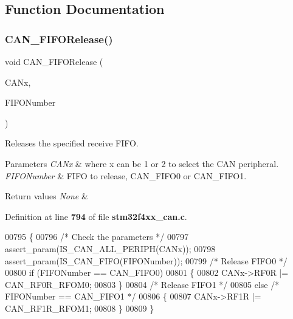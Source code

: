 \subsection{Function Documentation}
\mbox{\label{group__CAN__Group3_ga1bc3b39471e579b4101624c33d27918b}} 
\subsubsection{C\+A\+N\+\_\+\+F\+I\+F\+O\+Release()}
{\footnotesize\ttfamily void C\+A\+N\+\_\+\+F\+I\+F\+O\+Release (\begin{DoxyParamCaption}\item[{\textbf{ C\+A\+N\+\_\+\+Type\+Def} $\ast$}]{C\+A\+Nx,  }\item[{uint8\+\_\+t}]{F\+I\+F\+O\+Number }\end{DoxyParamCaption})}



Releases the specified receive F\+I\+FO. 


\begin{DoxyParams}{Parameters}
{\em C\+A\+Nx} & where x can be 1 or 2 to select the C\+AN peripheral. \\
\hline
{\em F\+I\+F\+O\+Number} & F\+I\+FO to release, C\+A\+N\+\_\+\+F\+I\+F\+O0 or C\+A\+N\+\_\+\+F\+I\+F\+O1. \\
\hline
\end{DoxyParams}

\begin{DoxyRetVals}{Return values}
{\em None} & \\
\hline
\end{DoxyRetVals}


Definition at line \textbf{ 794} of file \textbf{ stm32f4xx\+\_\+can.\+c}.


\begin{DoxyCode}
00795 \{
00796   \textcolor{comment}{/* Check the parameters */}
00797   assert_param(IS_CAN_ALL_PERIPH(CANx));
00798   assert_param(IS_CAN_FIFO(FIFONumber));
00799   \textcolor{comment}{/* Release FIFO0 */}
00800   \textcolor{keywordflow}{if} (FIFONumber == CAN_FIFO0)
00801   \{
00802     CANx->RF0R |= CAN_RF0R_RFOM0;
00803   \}
00804   \textcolor{comment}{/* Release FIFO1 */}
00805   \textcolor{keywordflow}{else} \textcolor{comment}{/* FIFONumber == CAN\_FIFO1 */}
00806   \{
00807     CANx->RF1R |= CAN_RF1R_RFOM1;
00808   \}
00809 \}
\end{DoxyCode}
\mbox{\label{group__CAN__Group3_ga7100459a95ce1b3cfe8ab15e112029fe}} 
